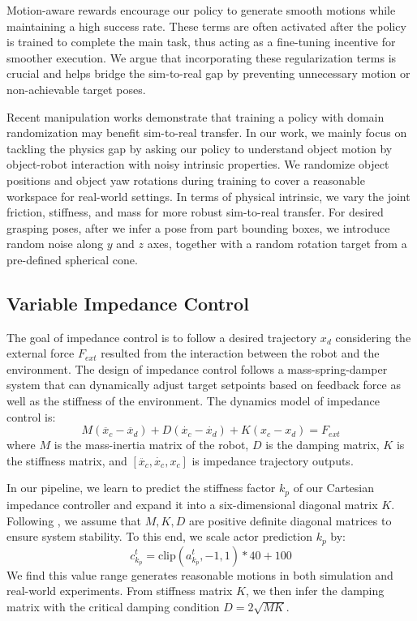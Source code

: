 Motion-aware rewards encourage our policy to generate smooth motions while maintaining a high success rate. These terms are often activated after the policy is trained to complete the main task, thus acting as a fine-tuning incentive for smoother execution. We argue that incorporating these regularization terms is crucial and helps bridge the sim-to-real gap by preventing unnecessary motion or non-achievable target poses.

Recent manipulation works \cite{partmanip,gapartnet,rgbmanip} demonstrate that training a policy with domain randomization may benefit sim-to-real transfer. In our work, we mainly focus on tackling the physics gap by asking our policy to understand object motion by object-robot interaction with noisy intrinsic properties. We randomize object positions and object yaw rotations during training to cover a reasonable workspace for real-world settings. In terms of physical intrinsic, we vary the joint friction, stiffness, and mass for more robust sim-to-real transfer. For desired grasping poses, after we infer a pose from part bounding boxes, we introduce random noise along $y$ and $z$ axes, together with a random rotation target from a pre-defined spherical cone.


\subsection{Variable Impedance Control} \label{method:impedance}

The goal of impedance control is to follow a desired trajectory $x_d$ considering the external force $F_{ext}$ resulted from the interaction between the robot and the environment. The design of impedance control follows a mass-spring-damper system that can dynamically adjust target setpoints based on feedback force as well as the stiffness of the environment. The dynamics model of impedance control is:
\[M(\ddot{x_c} - \ddot{x_d}) + D(\dot{x_c} - \dot{x_d}) + K({x_c} - {x_d}) = F_{ext}\]
where $M$ is the mass-inertia matrix of the robot, $D$ is the damping matrix, $K$ is the stiffness matrix, and $[\ddot{x_c}, \dot{x_c}, {x_c}]$ is impedance trajectory outputs.

In our pipeline, we learn to predict the stiffness factor $k_p$ of our Cartesian impedance controller  and expand it into a six-dimensional
diagonal matrix $K$. Following \cite{admitlearn, compliancetuning}, we assume that $M, K, D$ are positive definite diagonal matrices to ensure system stability. To this end, we scale actor prediction $k_p$ by:
\[c^t_{k_p} = \text{clip}(a^t_{k_p}, -1, 1) * 40 + 100\]
We find this value range generates reasonable motions in both simulation and real-world experiments. From stiffness matrix $K$, we then infer the damping matrix with the critical damping condition $D = 2\sqrt{MK}$.